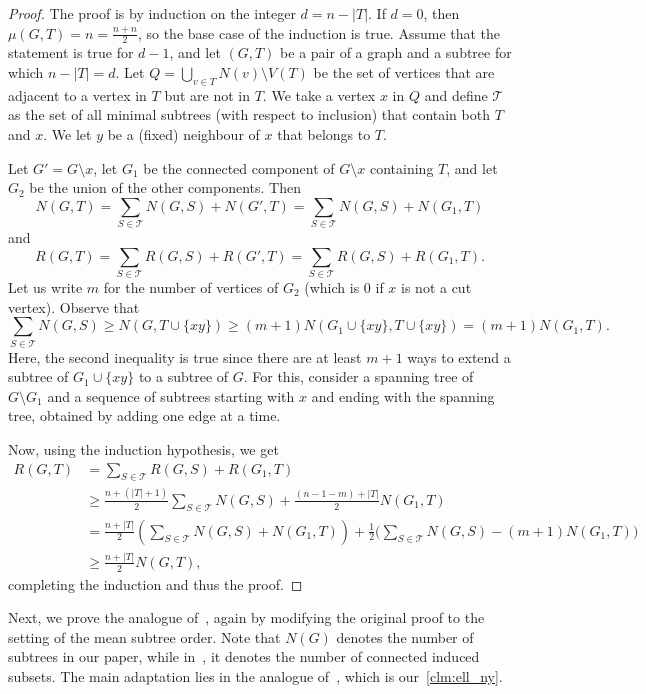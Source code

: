 \documentclass[11pt]{article}
\theoremstyle{definition}
\newcommand*{\abs}[1]{\lvert #1\rvert}
\begin{document}
\begin{proof} 
The proof is by induction on the integer $d = n- \abs{T}$. If $d=0$, then $\mu(G,T)=n=\frac{n+n}{2}$, so the base case of the induction is true. 
Assume that the statement is true for $d-1$, and let $(G,T)$ be a pair of a graph and a subtree for which $n-\abs T = d$. 
Let $Q= \bigcup_{v \in T} N(v) \setminus V(T)$ be the set of vertices that are adjacent to a vertex in $T$ but are not in $T$. 
We take a vertex $x$ in $Q$ and define $\mathcal T$ as the set of all minimal subtrees (with respect to inclusion) that contain both $T$ and $x.$ We let $y$ be a (fixed) neighbour of $x$ that belongs to $T$.
 

Let $G' = G \setminus x$, let $G_1$ be the connected component of $G \setminus x$ containing $T$, and let $G_2$ be the union of the other components. Then
\[N(G,T)= \sum_{S \in \mathcal T}  N(G, S )+ N(G',T) =\sum_{S \in \mathcal T} N(G, S ) + N(G_1,T)\]
and
\[R(G,T)= \sum_{S \in \mathcal T}  R(G, S )+ R(G',T) =\sum_{S \in \mathcal T} R(G, S ) + R(G_1,T).\]
Let us write $m$ for the number of vertices of $G_2$ %
(which is $0$ if $x$ is not a cut vertex). Observe that
$$\sum_{S \in \mathcal T} N(G, S ) \ge N(G, T \cup \{xy\}) \ge (m+1) N(G_1\cup \{xy\}, T \cup \{xy\}) = (m+1) N(G_1, T).$$
Here, the second inequality is true since there are at least $m+1$ ways to extend a subtree of $G_1\cup \{xy\}$ to a subtree of $G$.
For this, consider a spanning tree of $G \setminus G_1$ and a sequence of subtrees starting with $x$ and ending with the spanning tree, obtained by adding one edge at a time.


Now, using the induction hypothesis, we get
\begin{align*} R(G,T) &= \sum_{S \in \mathcal T} R(G, S ) + R(G_1,T)\\
&\ge \frac{n+(\abs{T}+1)}{2} \sum_{S \in \mathcal T} N(G, S ) + \frac{(n-1-m)+\abs T}{2} N(G_1,T) \\&=
\frac{n+\abs{T}}{2} \left( \sum_{S \in \mathcal T} N(G, S ) + N(G_1,T)  \right ) + \frac{1}{2} \Big (\sum_{S \in \mathcal T} N(G, S )- (m+1) N(G_1, T) \Big ) \\ & \ge \frac{n+\abs{T}}{2} N(G, T),
\end{align*}
completing the induction and thus the proof.
\end{proof} 

Next, we prove the analogue of~\cite[Lem.~3]{John22}, again by modifying the original proof to the setting of the mean subtree order.
Note that $N(G)$ denotes the number of subtrees in our paper, while in~\cite{John22}, it denotes the number of connected induced subsets.
The main adaptation lies in the analogue of~\cite[Clm.~3.3]{John22}, which is our~\cref{clm:ell_ny}.
\end{document}
